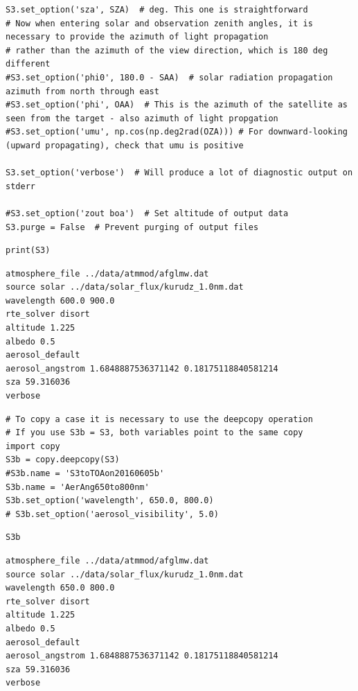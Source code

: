 \begin{lstlisting}[style=tinysize]
S3.set_option('sza', SZA)  # deg. This one is straightforward
# Now when entering solar and observation zenith angles, it is necessary to provide the azimuth of light propagation
# rather than the azimuth of the view direction, which is 180 deg different
#S3.set_option('phi0', 180.0 - SAA)  # solar radiation propagation azimuth from north through east
#S3.set_option('phi', OAA)  # This is the azimuth of the satellite as seen from the target - also azimuth of light propgation
#S3.set_option('umu', np.cos(np.deg2rad(OZA))) # For downward-looking (upward propagating), check that umu is positive

S3.set_option('verbose')  # Will produce a lot of diagnostic output on stderr

#S3.set_option('zout boa')  # Set altitude of output data
S3.purge = False  # Prevent purging of output files

\end{lstlisting}


\begin{lstlisting}[style=tinysize]
print(S3)
\end{lstlisting}


\begin{lstlisting}[style=outcellstyle]
atmosphere_file ../data/atmmod/afglmw.dat
source solar ../data/solar_flux/kurudz_1.0nm.dat
wavelength 600.0 900.0
rte_solver disort
altitude 1.225
albedo 0.5
aerosol_default 
aerosol_angstrom 1.6848887536371142 0.18175118840581214
sza 59.316036
verbose 

\end{lstlisting}


\begin{lstlisting}[style=tinysize]
# To copy a case it is necessary to use the deepcopy operation
# If you use S3b = S3, both variables point to the same copy
import copy
S3b = copy.deepcopy(S3)
#S3b.name = 'S3toTOAon20160605b'
S3b.name = 'AerAng650to800nm'
S3b.set_option('wavelength', 650.0, 800.0)
# S3b.set_option('aerosol_visibility', 5.0)
\end{lstlisting}


\begin{lstlisting}[style=tinysize]
S3b
\end{lstlisting}


\begin{lstlisting}[style=outcellstyle]
atmosphere_file ../data/atmmod/afglmw.dat
source solar ../data/solar_flux/kurudz_1.0nm.dat
wavelength 650.0 800.0
rte_solver disort
altitude 1.225
albedo 0.5
aerosol_default 
aerosol_angstrom 1.6848887536371142 0.18175118840581214
sza 59.316036
verbose 
\end{lstlisting}


